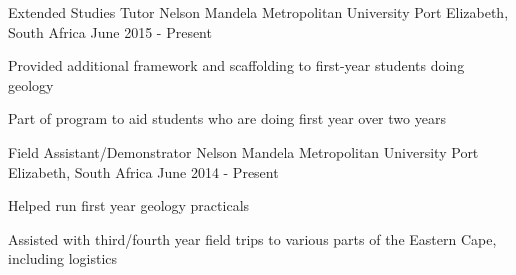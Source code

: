 


\begin{cventries}


\cventry
{Extended Studies Tutor} %
{Nelson Mandela Metropolitan University} %
{Port Elizabeth, South Africa} %
{June 2015 - Present} %
{ %
\begin{cvitems}
\item {Provided additional framework and scaffolding to first-year students doing geology}
\item {Part of program to aid students who are doing first year over two years}
\end{cvitems}
}


\cventry
{Field Assistant/Demonstrator} %
{Nelson Mandela Metropolitan University} %
{Port Elizabeth, South Africa} %
{June 2014 - Present} %
{ %
\begin{cvitems}
\item {Helped run first year geology practicals}
\item {Assisted with third/fourth year field trips to various parts of the Eastern Cape, including logistics}
\end{cvitems}
}



\end{cventries}
